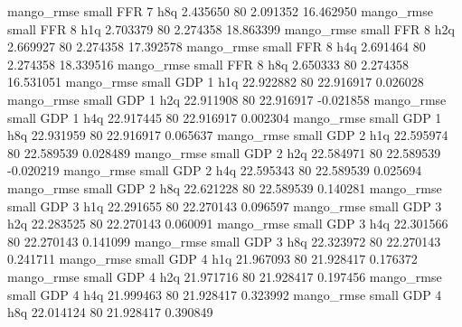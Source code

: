        mango_rmse      small      FFR                 7                  h8q  2.435650 80       2.091352          16.462950
       mango_rmse      small      FFR                 8                  h1q  2.703379 80       2.274358          18.863399
       mango_rmse      small      FFR                 8                  h2q  2.669927 80       2.274358          17.392578
       mango_rmse      small      FFR                 8                  h4q  2.691464 80       2.274358          18.339516
       mango_rmse      small      FFR                 8                  h8q  2.650333 80       2.274358          16.531051
       mango_rmse      small      GDP                 1                  h1q 22.922882 80      22.916917           0.026028
       mango_rmse      small      GDP                 1                  h2q 22.911908 80      22.916917          -0.021858
       mango_rmse      small      GDP                 1                  h4q 22.917445 80      22.916917           0.002304
       mango_rmse      small      GDP                 1                  h8q 22.931959 80      22.916917           0.065637
       mango_rmse      small      GDP                 2                  h1q 22.595974 80      22.589539           0.028489
       mango_rmse      small      GDP                 2                  h2q 22.584971 80      22.589539          -0.020219
       mango_rmse      small      GDP                 2                  h4q 22.595343 80      22.589539           0.025694
       mango_rmse      small      GDP                 2                  h8q 22.621228 80      22.589539           0.140281
       mango_rmse      small      GDP                 3                  h1q 22.291655 80      22.270143           0.096597
       mango_rmse      small      GDP                 3                  h2q 22.283525 80      22.270143           0.060091
       mango_rmse      small      GDP                 3                  h4q 22.301566 80      22.270143           0.141099
       mango_rmse      small      GDP                 3                  h8q 22.323972 80      22.270143           0.241711
       mango_rmse      small      GDP                 4                  h1q 21.967093 80      21.928417           0.176372
       mango_rmse      small      GDP                 4                  h2q 21.971716 80      21.928417           0.197456
       mango_rmse      small      GDP                 4                  h4q 21.999463 80      21.928417           0.323992
       mango_rmse      small      GDP                 4                  h8q 22.014124 80      21.928417           0.390849
